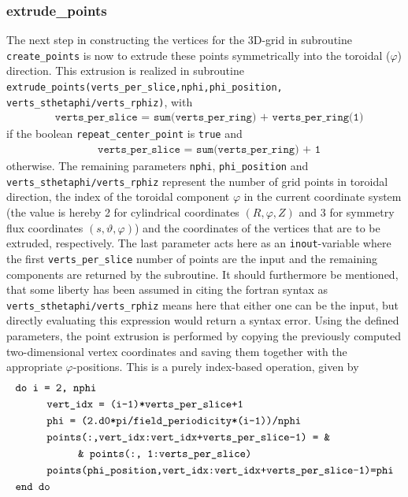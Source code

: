 \documentclass[./main.tex]{subfiles}
\begin{document}
\subsubsection{extrude\_points}
The next step in constructing the vertices for the 3D-grid in subroutine \texttt{create\_points} is now to extrude these points symmetrically into the toroidal ($\varphi$) direction. This extrusion is realized in subroutine \texttt{extrude\_points(verts\_per\_slice,nphi,phi\_position,}\\
\texttt{verts\_sthetaphi/verts\_rphiz)}, with
\begin{align*}
&\texttt{verts\_per\_slice = sum(verts\_per\_ring) + verts\_per\_ring(1)}
\end{align*}
if the boolean \texttt{repeat\_center\_point} is \texttt{true} and
\begin{align*}
&\texttt{verts\_per\_slice = sum(verts\_per\_ring) + 1}
\end{align*}
otherwise. The remaining parameters \texttt{nphi}, \texttt{phi\_position} and \texttt{verts\_sthetaphi/verts\_rphiz} represent the number of grid points in toroidal direction, the index of the toroidal component $\varphi$ in the current coordinate system (the value is hereby 2 for cylindrical coordinates $(R,\varphi,Z)$ and 3 for symmetry flux coordinates $(s,\vartheta,\varphi)$) and the coordinates of the vertices that are to be extruded, respectively. The last parameter acts here as an \texttt{inout}-variable where the first \texttt{verts\_per\_slice} number of points are the input and the remaining components are returned by the subroutine. It should furthermore be mentioned, that some liberty has been assumed in citing the fortran syntax as \texttt{verts\_sthetaphi/verts\_rphiz} means here that either one can be the input, but directly evaluating this expression would return a syntax error. Using the defined parameters, the point extrusion is performed by copying the previously computed two-dimensional vertex coordinates and saving them together with the appropriate $\varphi$-positions. This is a purely index-based operation, given by 
\begin{align*}
&    \texttt{do i = 2, nphi}\\
& \hspace{1.cm}  \texttt{vert\_idx = (i-1)*verts\_per\_slice+1}\\
& \hspace{1.cm}  \texttt{phi = (2.d0*pi/field\_periodicity*(i-1))/nphi}\\
& \hspace{1.cm}  \texttt{points(:,vert\_idx:vert\_idx+verts\_per\_slice-1) = \&}\\
& \hspace{2.cm}  \texttt{\& points(:, 1:verts\_per\_slice)}\\
& \hspace{1.cm}  \texttt{points(phi\_position,vert\_idx:vert\_idx+verts\_per\_slice-1)=phi}\\
&    \texttt{end do}
\end{align*}
\end{document}

